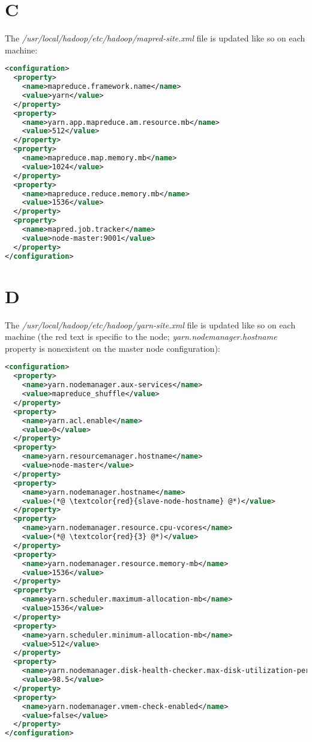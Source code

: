 \documentclass[10pt,journal,compsoc,float]{IEEEtran}
\begin{document}
\section*{C} \label{appendix:mapred}
The \textit{/usr/local/hadoop/etc/hadoop/mapred-site.xml} file is updated like so on each machine:
\begin{lstlisting}[language=xml]
<configuration>
  <property>
    <name>mapreduce.framework.name</name>
    <value>yarn</value>
  </property>
  <property>
    <name>yarn.app.mapreduce.am.resource.mb</name>
    <value>512</value>
  </property>
  <property>
    <name>mapreduce.map.memory.mb</name>
    <value>1024</value>
  </property>
  <property>
    <name>mapreduce.reduce.memory.mb</name>
    <value>1536</value>
  </property>
  <property>
    <name>mapred.job.tracker</name>
    <value>node-master:9001</value>
  </property>
</configuration>
\end{lstlisting}

\section*{D} \label{appendix:yarn}
The \textit{/usr/local/hadoop/etc/hadoop/yarn-site.xml} file is updated like so on each machine (the red text is specific to the node; \textit{yarn.nodemanager.hostname} property is nonexistent on the master node configuration):
\begin{lstlisting}[language=xml]
<configuration>
  <property>
    <name>yarn.nodemanager.aux-services</name>
    <value>mapreduce_shuffle</value>
  </property>
  <property>
    <name>yarn.acl.enable</name>
    <value>0</value>
  </property>
  <property>
    <name>yarn.resourcemanager.hostname</name>
    <value>node-master</value>
  </property>
  <property>
    <name>yarn.nodemanager.hostname</name>                  
    <value>(*@ \textcolor{red}{slave-node-hostname} @*)</value>
  </property>
  <property>
    <name>yarn.nodemanager.resource.cpu-vcores</name>
    <value>(*@ \textcolor{red}{3} @*)</value>
  </property>
  <property>
    <name>yarn.nodemanager.resource.memory-mb</name>
    <value>1536</value>
  </property>
  <property>
    <name>yarn.scheduler.maximum-allocation-mb</name>
    <value>1536</value>
  </property>
  <property>
    <name>yarn.scheduler.minimum-allocation-mb</name>
    <value>512</value>
  </property>
  <property>
    <name>yarn.nodemanager.disk-health-checker.max-disk-utilization-per-disk-percentage</name>
    <value>98.5</value>
  </property>
  <property>
    <name>yarn.nodemanager.vmem-check-enabled</name>
    <value>false</value>
  </property>
</configuration>
\end{lstlisting}
\end{document}

